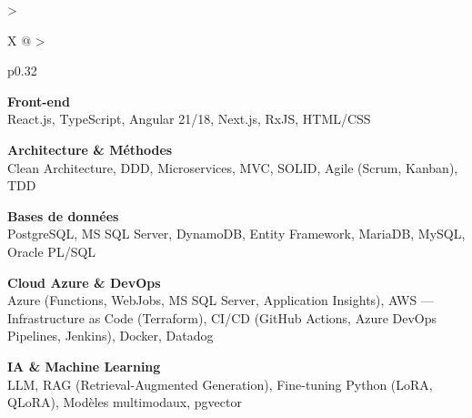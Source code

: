 \documentclass[10pt,a4paper]{article}
\begin{document}
\begin{tabularx}{\textwidth}{
  >{\raggedright\arraybackslash}X
  @{\hspace{1cm}}
  >{\raggedright\arraybackslash}p{0.32\textwidth}
}
\begin{minipage}[t]{\linewidth}
\textbf{\color{primary} Front-end}\\
\color{darkgray} React.js, TypeScript, Angular 21/18, Next.js, RxJS, HTML/CSS

\vspace{4pt}

\textbf{\color{primary} Architecture \& Méthodes}\\
\color{darkgray} Clean Architecture, DDD, Microservices, MVC, SOLID, Agile (Scrum, Kanban), TDD

\vspace{4pt}

\textbf{\color{primary} Bases de données}\\
\color{darkgray} PostgreSQL, MS SQL Server, DynamoDB, Entity Framework, MariaDB, MySQL, Oracle PL/SQL

\vspace{4pt}

\textbf{\color{primary} Cloud Azure \& DevOps}\\
\color{darkgray} Azure (Functions, WebJobs, MS SQL Server, Application Insights), AWS --- Infrastructure as Code (Terraform), CI/CD (GitHub Actions, Azure DevOps Pipelines, Jenkins), Docker, Datadog

\vspace{4pt}

\textbf{\color{primary} IA \& Machine Learning}\\
\color{darkgray} LLM, RAG (Retrieval-Augmented Generation), Fine-tuning Python (LoRA, QLoRA), Modèles multimodaux, pgvector

\vspace{4pt}

\end{minipage}
\\
\end{tabularx}
\end{document}
